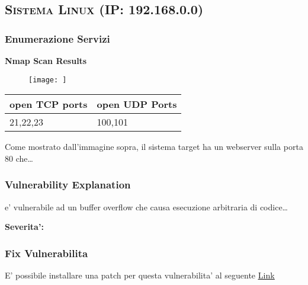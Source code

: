 \begin{cvletter}
\color{text}
   \subsection{\textsc{Sistema Linux (IP: 192.168.0.0)}}

   \subsubsection{Enumerazione Servizi}


   {{\fontsize{12pt}{1em}\bodyfont\bfseries\textcolor{text}{Nmap Scan Results}}}\\

   \begin{figure}[H]
      \centering
      \texttt{[image: ]}\\
   \end{figure}

   \begin{center}
      \begin{tabular}{ | l | l | }
       \hline
       \textbf{open TCP ports} & \textbf{open UDP Ports}\\ 
       \hline
       21,22,23 & 100,101\\ 
       \hline
      \end{tabular}
   \end{center}

   Come mostrato dall'immagine sopra, il sistema target ha un webserver sulla porta 80 che\dots


   \subsubsection{Vulnerability Explanation}
    e' vulnerabile ad un buffer overflow che causa esecuzione arbitraria di codice\dots

   {{\fontsize{12pt}{1em}\bodyfont\bfseries\textcolor{text}{Severita': \color{awesome-red}{Critica}}}\\

   \subsubsection{Fix Vulnerabilita}
   E' possibile installare una patch per questa vulnerabilita' al seguente \href{http://www.code-crafters.com/abilityserver/}{\underline{Link}}

}
\end{cvletter}

